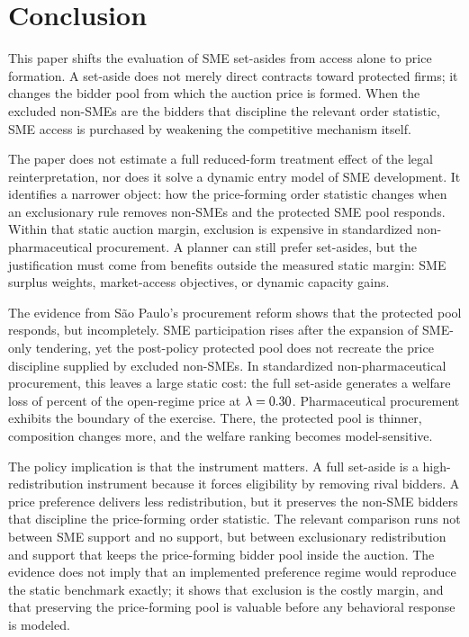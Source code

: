 \section{Conclusion}\label{sec:conclusion}

This paper shifts the evaluation of SME set-asides from access alone to
price formation. A set-aside does not merely direct contracts toward
protected firms; it changes the bidder pool from which the auction price
is formed. When the excluded non-SMEs are the bidders that discipline the
relevant order statistic, SME access is purchased by weakening the
competitive mechanism itself.

The paper does not estimate a full reduced-form treatment effect of the
legal reinterpretation, nor does it solve a dynamic entry model of SME
development. It identifies a narrower object: how the price-forming order
statistic changes when an exclusionary rule removes non-SMEs and the
protected SME pool responds. Within that static auction margin, exclusion
is expensive in standardized non-pharmaceutical procurement. A planner
can still prefer set-asides, but the justification must come from
benefits outside the measured static margin: SME surplus weights,
market-access objectives, or dynamic capacity gains.

The evidence from S\~ao Paulo's procurement reform shows that the
protected pool responds, but incompletely. SME participation rises after
the expansion of SME-only tendering, yet the post-policy protected pool
does not recreate the price discipline supplied by excluded non-SMEs. In
standardized non-pharmaceutical procurement, this leaves a large static
cost: the full set-aside generates a welfare loss of
\welfLossPctLthirtyNp{} percent of the open-regime price at
$\lambda=0.30$. Pharmaceutical procurement exhibits the boundary
of the exercise. There, the protected pool is thinner, composition
changes more, and the welfare ranking becomes model-sensitive.

The policy implication is that the instrument matters. A full set-aside
is a high-redistribution instrument because it forces eligibility by
removing rival bidders. A price preference delivers less redistribution,
but it preserves the non-SME bidders that discipline the price-forming
order statistic. The relevant comparison runs not between SME support
and no support, but between exclusionary redistribution and support that
keeps the price-forming bidder pool inside the auction. The evidence
does not imply that an implemented preference regime would reproduce the
static benchmark exactly; it shows that exclusion is the costly margin,
and that preserving the price-forming pool is valuable before any
behavioral response is modeled.

